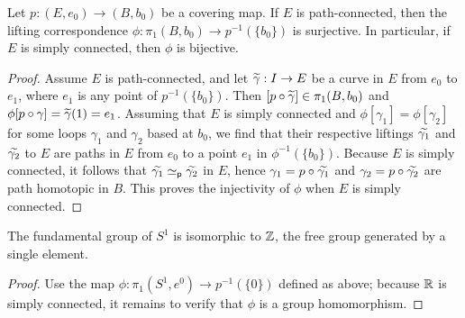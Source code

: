 \begin{thm}
    Let $p: (E, e_0)\rightarrow (B, b_0)$ be a covering map.
    If $E$ is path-connected, then the lifting correspondence $\phi: \pi_1(B, b_0)\rightarrow p^{-1}(\{b_0\})$ is surjective.
    In particular, if $E$ is simply connected, then $\phi$ is bijective.
\end{thm}
\begin{proof}
    Assume $E$ is path-connected, and let $\widetilde{\gamma}: I\rightarrow E$ be a curve in $E$ from $e_0$ to $e_1$, where $e_1$ is any point of $p^{-1}(\{b_0\})$.
    Then $[p\circ\widetilde{\gamma}]\in \pi_1(B, b_0)$ and $\phi[p\circ\gamma]=\widetilde{\gamma}(1)=e_1$.
    Assuming that $E$ is simply connected and $\phi[\gamma_1]=\phi[\gamma_2]$ for some loops $\gamma_1$ and $\gamma_2$ based at $b_0$, we find that their respective liftings $\widetilde{\gamma_1}$ and $\widetilde{\gamma_2}$ to $E$ are paths in $E$ from $e_0$ to a point $e_1$ in $\phi^{-1}(\{b_0\})$.
    Because $E$ is simply connected, it follows that $\widetilde{\gamma_1}\simeq_\textsf{p}\widetilde{\gamma_2}$ in $E$, hence $\gamma_1=p\circ\widetilde{\gamma_1}$ and $\gamma_2=p\circ\widetilde{\gamma_2}$ are path homotopic in $B$.
    This proves the injectivity of $\phi$ when $E$ is simply connected.
\end{proof}

\begin{thm}
    The fundamental group of $S^1$ is isomorphic to ${\mathbb{Z}}$, the free group generated by a single element.
\end{thm}
\begin{proof}
    \color{brown}Use the map $\phi: \pi_1(S^1, e^0)\rightarrow p^{-1}(\{0\})$ defined as above; because ${\mathbb{R}}$ is simply connected, it remains to verify that $\phi$ is a group homomorphism.\color{black}
\end{proof}

